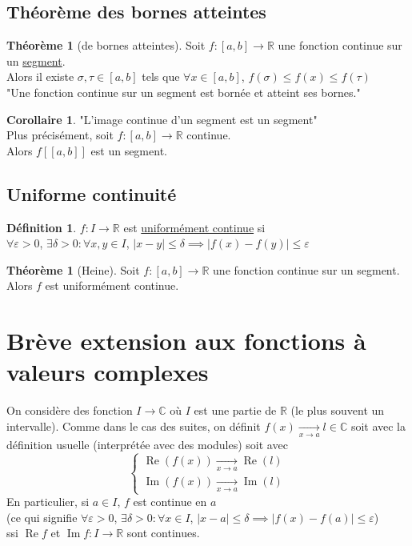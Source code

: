 \documentclass[10pt,a4paper]{article}
\theoremstyle{definition}
\newtheorem{theorem}[proposition]{Théorème}
\newtheorem{corollaire}[proposition]{Corollaire}
\newtheorem{definition}[proposition]{Définition}
\DeclareMathOperator{\re}{Re}
\DeclareMathOperator{\im}{Im}
\begin{document}
\subsection{Théorème des bornes atteintes}
\begin{theorem}[de bornes atteintes]
Soit $f: [a, b] \to \mathbb{R}$ une fonction continue sur un \uline{segment}. \\
Alors il existe $\sigma, \tau \in [a, b]$ tels que $\forall x \in [a, b]$, $f(\sigma) \leq f(x) \leq f(\tau)$ \\
"Une fonction continue sur un segment est bornée et atteint ses bornes."
\end{theorem}
\begin{corollaire}
"L'image continue d'un segment est un segment" \\
Plus précisément, soit $f: [a, b] \to \mathbb{R}$ continue. \\
Alors $f[[a, b]]$ est un segment.
\end{corollaire}

\subsection{Uniforme continuité}
\begin{definition}
$f: I \to \mathbb{R}$ est \uline{uniformément continue} si \\
$\forall \varepsilon > 0$, $\exists \delta > 0 : \forall x, y \in I$, $|x - y| \leq \delta \implies |f(x) - f(y)| \leq \varepsilon$
\end{definition}
\begin{theorem}[Heine]
Soit $f: [a, b] \to \mathbb{R}$ une fonction continue sur un segment. \\
Alors $f$ est uniformément continue.
\end{theorem}

\section{Brève extension aux fonctions à valeurs complexes}
On considère des fonction $I \to \mathbb{C}$ où $I$ est une partie de $\mathbb{R}$ (le plus souvent un intervalle). Comme dans le cas des suites, on définit $f(x) \xrightarrow[x \to a]{} l \in \mathbb{C}$ soit avec la définition usuelle (interprétée avec des modules) soit avec
\[\begin{cases}
\re(f(x)) \xrightarrow[x \to a]{} \re(l) \\ \im(f(x)) \xrightarrow[x \to a]{} \im(l)
\end{cases}\]
En particulier, si $a \in I$, $f$ est continue en $a$ \\
(ce qui signifie $\forall \varepsilon > 0$, $\exists \delta > 0: \forall x \in I$, $|x - a| \leq \delta \implies |f(x) - f(a)| \leq \varepsilon$) \\
ssi $\re f$ et $\im f: I \to \mathbb{R}$ sont continues.\medskip
\end{document}
